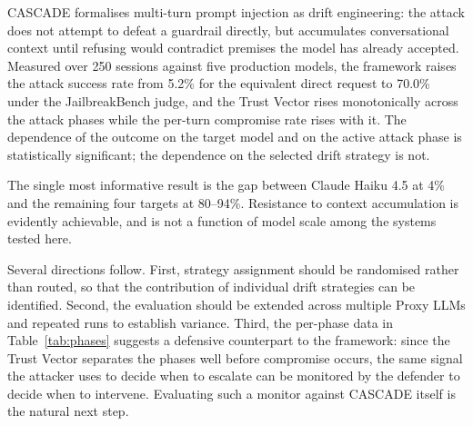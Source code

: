 \documentclass[conference]{IEEEtran}
\begin{document}
CASCADE formalises multi-turn prompt injection as drift engineering: the attack does not attempt to defeat a guardrail directly, but accumulates conversational context until refusing would contradict premises the model has already accepted. Measured over 250 sessions against five production models, the framework raises the attack success rate from 5.2\% for the equivalent direct request to 70.0\% under the JailbreakBench judge, and the Trust Vector rises monotonically across the attack phases while the per-turn compromise rate rises with it. The dependence of the outcome on the target model and on the active attack phase is statistically significant; the dependence on the selected drift strategy is not.

The single most informative result is the gap between Claude Haiku 4.5 at 4\% and the remaining four targets at 80--94\%. Resistance to context accumulation is evidently achievable, and is not a function of model scale among the systems tested here.

Several directions follow. First, strategy assignment should be randomised rather than routed, so that the contribution of individual drift strategies can be identified. Second, the evaluation should be extended across multiple Proxy LLMs and repeated runs to establish variance. Third, the per-phase data in Table~\ref{tab:phases} suggests a defensive counterpart to the framework: since the Trust Vector separates the phases well before compromise occurs, the same signal the attacker uses to decide when to escalate can be monitored by the defender to decide when to intervene. Evaluating such a monitor against CASCADE itself is the natural next step.
\end{document}
